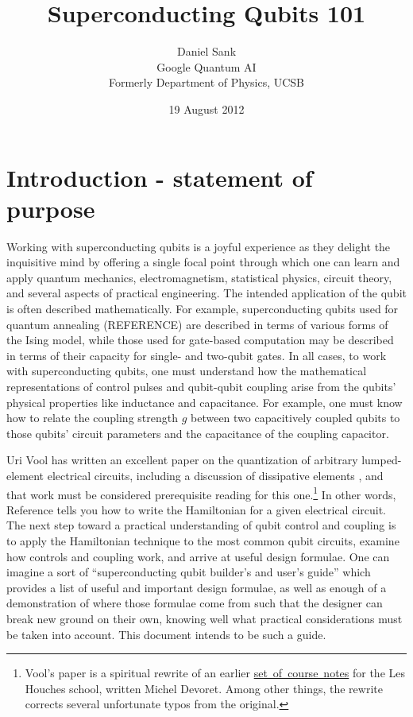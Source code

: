 \documentclass[twocolumn]{article}
\title{Superconducting Qubits 101}
\author{Daniel Sank \\
\small Google Quantum AI \\
\small Formerly Department of Physics, UCSB}
\date{19 August 2012}
\begin{document}
\maketitle
\tableofcontents

\section{Introduction - statement of purpose}

Working with superconducting qubits is a joyful experience as they delight the inquisitive mind by offering a single focal point through which one can learn and apply quantum mechanics, electromagnetism, statistical physics, circuit theory, and several aspects of practical engineering.
The intended application of the qubit is often described mathematically.
For example, superconducting qubits used for quantum annealing (REFERENCE) are described in terms of various forms of the Ising model, while those used for gate-based computation may be described in terms of their capacity for single- and two-qubit gates.
In all cases, to work with superconducting qubits, one must understand how the mathematical representations of control pulses and qubit-qubit coupling arise from the qubits' physical properties like inductance and capacitance.
For example, one must know how to relate the coupling strength $g$ between two capacitively coupled qubits to those qubits' circuit parameters and the capacitance of the coupling capacitor.

Uri Vool has written an excellent paper on the quantization of arbitrary lumped-element electrical circuits, including a discussion of dissipative elements \cite{Vool:quantumCircuits}, and that work must be considered prerequisite reading for this one.\footnote{Vool's paper is a spiritual rewrite of an earlier \mbox{\href{http://qulab.eng.yale.edu/documents/reprints/Houches_fluctuations.pdf}{set of course notes}} for the Les Houches school, written Michel Devoret. Among other things, the rewrite corrects several unfortunate typos from the original.}
In other words, Reference \cite{Vool:quantumCircuits} tells you how to write the Hamiltonian for a given electrical circuit.
The next step toward a practical understanding of qubit control and coupling is to apply the Hamiltonian technique to the most common qubit circuits, examine how controls and coupling work, and arrive at useful design formulae.
One can imagine a sort of ``superconducting qubit builder's and user's guide'' which provides a list of useful and important design formulae, as well as enough of a demonstration of where those formulae come from such that the designer can break new ground on their own, knowing well what practical considerations must be taken into account.
This document intends to be such a guide.
\end{document}

